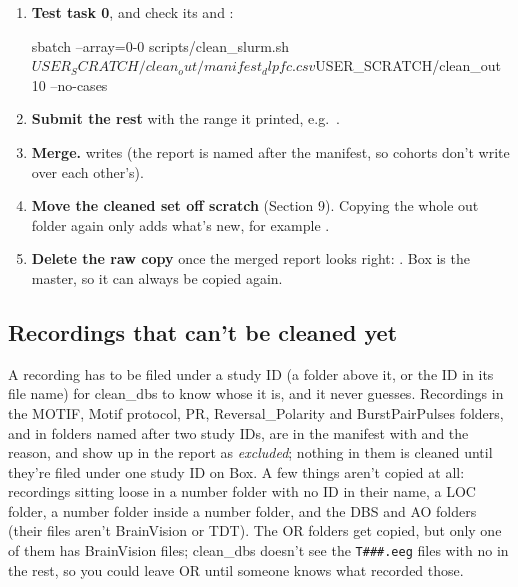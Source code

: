 \begin{enumerate}
\begin{codebox}
python scripts/make_manifest.py $USER_SCRATCH/dbs_raw/dlpfc $USER_SCRATCH/clean_out/manifest_dlpfc.csv --chunk 10
\end{codebox}
  It can take more than one raw folder (), and so can . If it stops at the names check, do the privacy step below and run it again. When it works it prints the whole  line to use, with  when none of the cohort's IDs are in .
  \item \textbf{Test task 0}, and check its  and :
\begin{codebox}
sbatch --array=0-0 scripts/clean_slurm.sh $USER_SCRATCH/clean_out/manifest_dlpfc.csv $USER_SCRATCH/clean_out 10 --no-cases
\end{codebox}
  \item \textbf{Submit the rest} with the range it printed, e.g.\ .
  \item \textbf{Merge.}  writes  (the report is named after the manifest, so cohorts don't write over each other's).
  \item \textbf{Move the cleaned set off scratch} (Section 9). Copying the whole out folder again only adds what's new, for example .
  \item \textbf{Delete the raw copy} once the merged report looks right: . Box is the master, so it can always be copied again.
\end{enumerate}

\subsection{Recordings that can't be cleaned yet}
A recording has to be filed under a study ID (a folder above it, or the ID in its file name) for clean\_dbs to know whose it is, and it never guesses. Recordings in the MOTIF, Motif protocol, PR, Reversal\_Polarity and BurstPairPulses folders, and in folders named after two study IDs, are in the manifest with  and the reason, and show up in the report as \textit{excluded}; nothing in them is cleaned until they're filed under one study ID on Box. A few things aren't copied at all: recordings sitting loose in a number folder with no ID in their name, a LOC folder, a number folder inside a number folder, and the DBS and AO folders (their files aren't BrainVision or TDT). The OR folders get copied, but only one of them has BrainVision files; clean\_dbs doesn't see the \texttt{T\#\#\#.eeg} files with no  in the rest, so you could leave OR until someone knows what recorded those.

